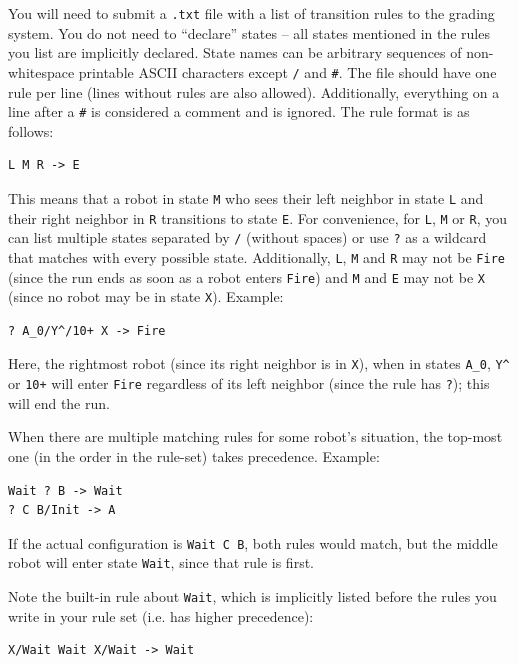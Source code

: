 \documentclass[12pt]{article}
\begin{document}
You will need to submit a \verb|.txt| file with a list of transition rules to the grading system. You do not need to ``declare'' states -- all states mentioned in the rules you list are implicitly declared. State names can be arbitrary sequences of non-whitespace printable ASCII characters except \verb|/| and \verb|#|. The file should have one rule per line (lines without rules are also allowed). Additionally, everything on a line after a \verb|#| is considered a comment and is ignored. The rule format is as follows:

\begin{verbatim}
L M R -> E
\end{verbatim}

This means that a robot in state \verb|M| who sees their left neighbor in state \verb|L| and their right neighbor in \verb|R| transitions to state \verb|E|. For convenience, for \verb|L|, \verb|M| or \verb|R|, you can list multiple states separated by \verb|/| (without spaces) or use \verb|?| as a wildcard
that matches with every possible state. Additionally, \verb|L|, \verb|M| and \verb|R| may not be \verb|Fire| (since the run ends as soon as a robot enters \verb|Fire|) and \verb|M| and \verb|E| may not be \verb|X| (since no robot may be in state \verb|X|). Example:

\begin{verbatim}
? A_0/Y^/10+ X -> Fire
\end{verbatim}

Here, the rightmost robot (since its right neighbor is in \verb|X|), when in states
\verb|A_0|, \verb|Y^| or \verb|10+| will enter \verb|Fire| regardless of its left neighbor (since the rule has \verb|?|); this will end the run.

When there are multiple matching rules for some robot's situation, the top-most one (in the order in the rule-set) takes precedence. Example:

\begin{verbatim}
Wait ? B -> Wait
? C B/Init -> A
\end{verbatim}

If the actual configuration is \verb|Wait C B|, both rules would match, but the middle robot will enter state \verb|Wait|, since that rule is first.

Note the built-in rule about \verb|Wait|, which is implicitly listed before the rules you write in your rule set (i.e. has higher precedence):

\begin{verbatim}
X/Wait Wait X/Wait -> Wait
\end{verbatim}
\end{document}
